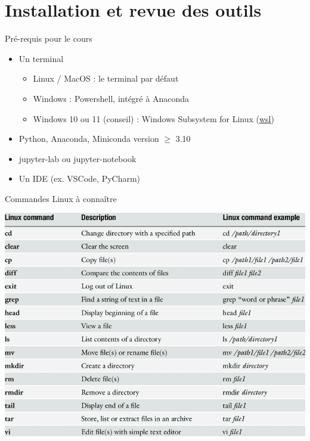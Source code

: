 \section{Installation et revue des outils}




\begin{frame}{Pré-requis pour le cours}
  \begin{itemize}[<+->]
    \item Un terminal
      \begin{itemize}
        \item Linux / MacOS : le terminal par défaut
        \item Windows : Powershell, intégré à Anaconda
        \item Windows 10 ou 11 (conseil) : Windows Subsystem for Linux
        (\underline{\href{https://learn.microsoft.com/fr-fr/windows/wsl/install}{wsl}})
        
      \end{itemize}
    \item Python, Anaconda, Miniconda version $\geq$ 3.10
    \item jupyter-lab ou jupyter-notebook
    \item Un IDE (ex. VSCode, PyCharm)
  \end{itemize}


\end{frame}



\begin{frame}{Commandes Linux à connaître}
  \begin{center}
    \includegraphics[width=\textwidth]{img/List-of-basic-Linux-commands.png}
  \end{center}
\end{frame}



